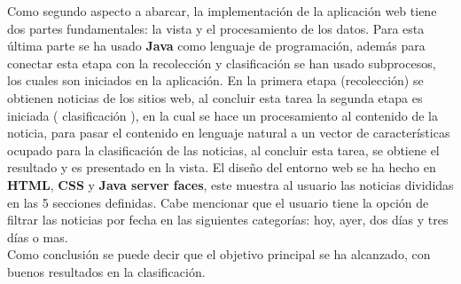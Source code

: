Como segundo aspecto a abarcar, la implementación de la aplicación web tiene dos partes fundamentales: la vista  y el procesamiento de los datos. Para esta última parte se ha usado \textbf{Java} como lenguaje de programación, además para conectar esta etapa con la recolección y clasificación se han usado subprocesos, los cuales son iniciados en la aplicación. En la primera etapa (recolección) se obtienen noticias de los sitios web, al concluir esta tarea la segunda etapa es iniciada ( clasificación ), en la cual se hace un procesamiento al contenido de la noticia, para pasar el contenido en lenguaje natural a un vector de características ocupado para la clasificación de las noticias, al concluir esta tarea, se obtiene el resultado y es presentado en la vista. El diseño del entorno web se ha hecho en  \textbf{HTML}, \textbf{CSS} y \textbf{Java server faces}, este muestra al usuario las noticias divididas en las 5 secciones definidas. Cabe mencionar que el usuario tiene la opción de filtrar las noticias por fecha en las siguientes categorías: hoy, ayer, dos días y tres días o mas.\\

Como conclusión se puede decir que el objetivo principal se ha alcanzado, con buenos resultados en la clasificación.



%

%
